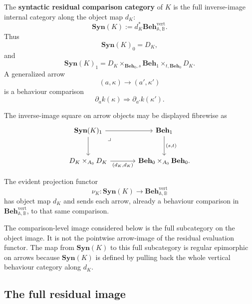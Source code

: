 \begin{definition}
\label{def:syntactic-residual-comparison-category}
    The \textbf{syntactic residual comparison category} of \(K\) is the full inverse-image internal category along the object map \(d_K\):
    \[
        \mathbf{Syn}(K):=d_K^*
        \mathbf{Beh}^{\mathrm{vert}}_{\mathbb A,\mathbb B}.
    \]
    Thus
    \[
        \mathbf{Syn}(K)_0=D_K,
    \]
    and
    \[
        \mathbf{Syn}(K)_1
        =
        D_K
        \times_{\mathbf{Beh}_0,s}
        \mathbf{Beh}_1
        \times_{t,\mathbf{Beh}_0}
        D_K.
    \]
    A generalized arrow
    \[
        (a,\kappa)\to(a',\kappa')
    \]
    is a behaviour comparison
    \[
        \partial_a k(\kappa)
        \Rightarrow
        \partial_{a'} k(\kappa').
    \]
\end{definition}

The inverse-image square on arrow objects may be displayed fibrewise as
\[
    \begin{tikzcd}[column sep=large, row sep=large]
            \mathbf{Syn}(K)_1
                \arrow[r]
                \arrow[d]
                \arrow[dr, phantom, "\lrcorner", very near start]
        &
            \mathbf{Beh}_1
                \arrow[d, "{(s,t)}"]
        \\
            D_K\times_{A_0}D_K
                \arrow[r, "{(d_K,d_K)}"']
        &
            \mathbf{Beh}_0\times_{A_0}\mathbf{Beh}_0.
    \end{tikzcd}
\]

The evident projection functor
\[
    \nu_K:
    \mathbf{Syn}(K)\to
    \mathbf{Beh}^{\mathrm{vert}}_{\mathbb A,\mathbb B}
\]
has object map \(d_K\) and sends each arrow, already a behaviour comparison in \(\mathbf{Beh}^{\mathrm{vert}}_{\mathbb A,\mathbb B}\), to that same comparison.

\begin{remark}
\label{rem:comparison-level-image-full}
    The comparison-level image considered below is the full subcategory on the object image. It is not the pointwise arrow-image of the residual evaluation functor. The map from \(\mathbf{Syn}(K)\) to this full subcategory is regular epimorphic on arrows because \(\mathbf{Syn}(K)\) is defined by pulling back the whole vertical behaviour category along \(d_K\).
\end{remark}

\subsection{The full residual image}
\label{subsec:full-residual-image}

